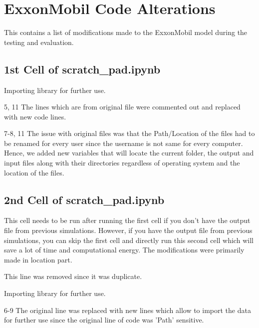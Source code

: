 \chapter{ExxonMobil Code Alterations}
\label{ch:appendixexxonmobil}
This \appendixname{} contains a list of modifications made to the ExxonMobil model during the testing and evaluation.


\section{1st Cell of {\codefont scratch\_pad.ipynb}}
\begin{codemodifications}

\begin{codemodification}{1}
Importing  library for further use.
\end{codemodification}

\begin{codemodification}{5, 11}
The lines which are from original file were commented out and replaced with new code lines.
\end{codemodification}

\begin{codemodification}{7-8, 11}
The issue with original files was that the Path/Location of the files had to be renamed for every user since the username is not same for every computer. Hence, we added new variables that will locate the current folder, the output and input files along with their directories regardless of operating system and the location of the files.
\end{codemodification}

\end{codemodifications}

\section{2nd Cell of {\codefont scratch\_pad.ipynb}}
This cell needs to be run after running the first cell if you don't have the output file from previous simulations. However, if you have the output file from previous simulations, you can skip the first cell and directly run this second cell which will save a lot of time and computational energy. The modifications were primarily made in location part. 
\begin{codemodifications}

\begin{codemodification}{1}
This line was removed since it was duplicate.
\end{codemodification}

\begin{codemodification}{5}
Importing  library for further use.
\end{codemodification}

\begin{codemodification}{6-9}
The original line was replaced with new lines which allow to import the data for further use since the original line of code was 'Path' sensitive.
\end{codemodification}

\end{codemodifications} 


